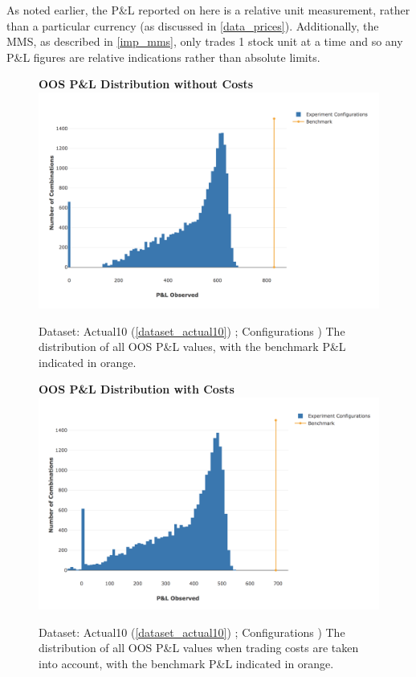 \documentclass[a4paper,11pt,oneside]{article}
\theoremstyle{plain}
\theoremstyle{definition}
\begin{document}
	As noted earlier, the P\&L reported on here is a relative unit measurement, rather than a particular currency (as discussed in \ref{data_prices}). Additionally, the MMS, as described in \ref{imp_mms}, only trades 1 stock unit at a time and so any P\&L figures are relative indications rather than absolute limits.
	
	\begin{figure}[H]
		\centering
		\textbf{OOS P\&L Distribution without Costs}
		\includegraphics[scale=0.35]{images/results/mms/profits_nocost.png} 
		\caption[OOS P\&L Distribution without Costs]{Dataset: Actual10 (\ref{dataset_actual10}) ; Configurations )
			\newline The distribution of all OOS P\&L values, with the benchmark P\&L indicated in orange.}
		\label{figure-results_pl_pdf}
	\end{figure}
	
	\begin{figure}[H]
		\centering
		\textbf{OOS P\&L Distribution with Costs}
		\includegraphics[scale=0.35]{images/results/mms/profits_cost.png} 
		\caption[OOS P\&L Distribution with Costs]{Dataset: Actual10 (\ref{dataset_actual10}) ; Configurations )
			\newline The distribution of all OOS P\&L values when trading costs are taken into account, with the benchmark P\&L indicated in orange.}
		\label{figure-results_pl_pdf_cost}
	\end{figure}
	
\end{document}
